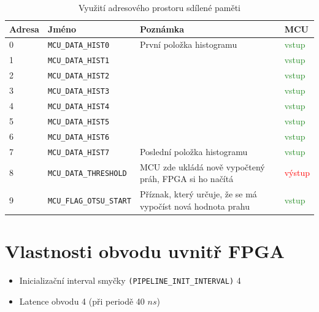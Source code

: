 \documentclass[12pt,a4paper,titlepage,final]{report}
\begin{document}
\begin{table}[h!]
	\begin{center}
    \begin{tabular}{ | p{1.5cm} | p{4cm} | p{5cm} | p{1.5cm} |}
    \hline
    Adresa & Jméno & Poznámka & MCU
    \\ \hline
    
   	0 & \verb|MCU_DATA_HIST0| & První položka histogramu
   		& \textcolor{ForestGreen}{vstup}
	\\ \hline
	1 & \verb|MCU_DATA_HIST1| &
		& \textcolor{ForestGreen}{vstup}
	\\ \hline
	2 & \verb|MCU_DATA_HIST2| &
		& \textcolor{ForestGreen}{vstup}
	\\ \hline
	3 & \verb|MCU_DATA_HIST3| &
		& \textcolor{ForestGreen}{vstup}
	\\ \hline
	4 & \verb|MCU_DATA_HIST4| &
		& \textcolor{ForestGreen}{vstup}
	\\ \hline
	5 & \verb|MCU_DATA_HIST5| &
		& \textcolor{ForestGreen}{vstup}
	\\ \hline
	6 & \verb|MCU_DATA_HIST6| &
		& \textcolor{ForestGreen}{vstup}
	\\ \hline
	7 & \verb|MCU_DATA_HIST7| & Poslední položka histogramu
	& \textcolor{ForestGreen}{vstup}
	\\ \hline
	8 & \verb|MCU_DATA_THRESHOLD| & MCU zde ukládá nově vypočtený práh, FPGA si ho načítá
	& \textcolor{red}{výstup}
	\\ \hline
	9 & \verb|MCU_FLAG_OTSU_START| & Příznak, který určuje, že se má vypočíst nová hodnota prahu & \textcolor{ForestGreen}{vstup}
	\\ \hline    	
	
    \end{tabular}
	\end{center}	
	\caption{Využití adresového prostoru sdílené paměti}  
\end{table}


\section{Vlastnosti obvodu uvnitř FPGA}

\begin{itemize}
	\item Inicializační interval smyčky \verb|(PIPELINE_INIT_INTERVAL)| 4
	\item Latence obvodu 4 (při periodě 40 $ns$)
\end{itemize}
\end{document}
